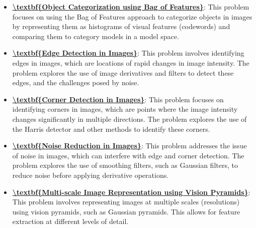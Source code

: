 \documentclass{article}%
\begin{document}
\begin{itemize}[leftmargin=*]%
\item \href{https://www.math.purdue.edu/~yipn/351/08L2-Feature Extraction.pdf#page=2}{\textbf{\textbackslash{}textbf\{Object Categorization using Bag of Features\}}}: This problem focuses on using the Bag of Features approach to categorize objects in images by representing them as histograms of visual features (codewords) and comparing them to category models in a model space.%
\item \href{https://www.math.purdue.edu/~yipn/351/08L2-Feature Extraction.pdf#page=4}{\textbf{\textbackslash{}textbf\{Edge Detection in Images\}}}: This problem involves identifying edges in images, which are locations of rapid changes in image intensity. The problem explores the use of image derivatives and filters to detect these edges, and the challenges posed by noise.%
\item \href{https://www.math.purdue.edu/~yipn/351/08L2-Feature Extraction.pdf#page=20}{\textbf{\textbackslash{}textbf\{Corner Detection in Images\}}}: This problem focuses on identifying corners in images, which are points where the image intensity changes significantly in multiple directions. The problem explores the use of the Harris detector and other methods to identify these corners.%
\item \href{https://www.math.purdue.edu/~yipn/351/08L2-Feature Extraction.pdf#page=35}{\textbf{\textbackslash{}textbf\{Noise Reduction in Images\}}}: This problem addresses the issue of noise in images, which can interfere with edge and corner detection. The problem explores the use of smoothing filters, such as Gaussian filters, to reduce noise before applying derivative operations.%
\item \href{https://www.math.purdue.edu/~yipn/351/08L2-Feature Extraction.pdf#page=30}{\textbf{\textbackslash{}textbf\{Multi{-}scale Image Representation using Vision Pyramids\}}}: This problem involves representing images at multiple scales (resolutions) using vision pyramids, such as Gaussian pyramids. This allows for feature extraction at different levels of detail.%
\end{itemize}%
\end{document}
